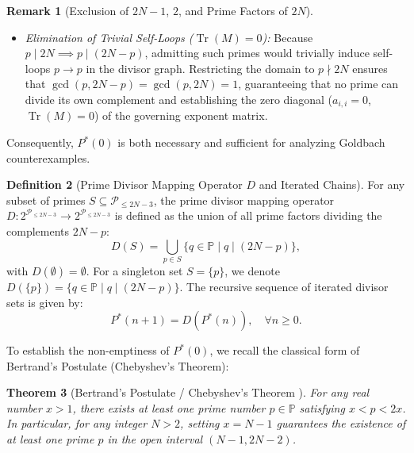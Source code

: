 \documentclass[11pt,a4paper]{article}
\newtheorem{theorem}{Theorem}[section]
\theoremstyle{definition}
\newtheorem{definition}[theorem]{Definition}
\newtheorem{remark}[theorem]{Remark}
\begin{document}
\begin{remark}[Exclusion of $2N-1$, $2$, and Prime Factors of $2N$]
\begin{enumerate}
\begin{itemize}
        \item \emph{Elimination of Trivial Self-Loops ($\operatorname{Tr}(M) = 0$):} Because $p \mid 2N \implies p \mid (2N - p)$, admitting such primes would trivially induce self-loops $p \to p$ in the divisor graph. Restricting the domain to $p \nmid 2N$ ensures that $\gcd(p, 2N - p) = \gcd(p, 2N) = 1$, guaranteeing that no prime can divide its own complement and establishing the zero diagonal ($a_{i,i} = 0$, $\operatorname{Tr}(M) = 0$) of the governing exponent matrix.
    \end{itemize}
\end{enumerate}
Consequently, $P^*(0)$ is both necessary and sufficient for analyzing Goldbach counterexamples.
\end{remark}

\begin{definition}[Prime Divisor Mapping Operator $D$ and Iterated Chains]
\label{def:divisor_mapping}
For any subset of primes $S \subseteq \mathcal{P}_{\le 2N-3}$, the prime divisor mapping operator $D: 2^{\mathcal{P}_{\le 2N-3}} \to 2^{\mathcal{P}_{\le 2N-3}}$ is defined as the union of all prime factors dividing the complements $2N - p$:
\[
D(S) = \bigcup_{p \in S} \{ q \in \mathbb{P} \mid q \mid (2N - p) \},
\]
with $D(\emptyset) = \emptyset$. For a singleton set $S = \{p\}$, we denote $D(\{p\}) = \{ q \in \mathbb{P} \mid q \mid (2N - p) \}$. The recursive sequence of iterated divisor sets is given by:
\[
P^*(n+1) = D(P^*(n)), \quad \forall n \ge 0.
\]
\end{definition}

To establish the non-emptiness of $P^*(0)$, we recall the classical form of Bertrand's Postulate (Chebyshev's Theorem):

\begin{theorem}[Bertrand's Postulate / Chebyshev's Theorem \cite{chebyshev1852}]
\label{thm:bertrand}
For any real number $x > 1$, there exists at least one prime number $p \in \mathbb{P}$ satisfying $x < p < 2x$. In particular, for any integer $N > 2$, setting $x = N - 1$ guarantees the existence of at least one prime $p$ in the open interval $(N - 1, 2N - 2)$.
\end{theorem}
\end{document}

